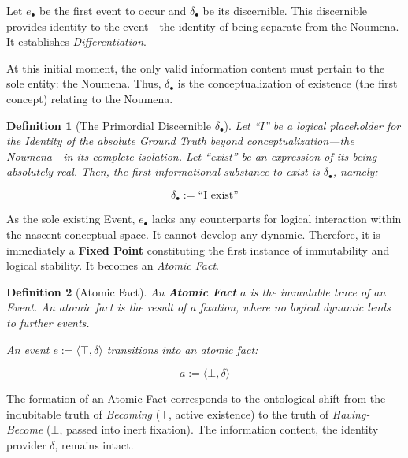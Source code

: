 \documentclass[11pt, a4paper]{article}
\theoremstyle{formalism}
\newtheorem{formalism}{Definition}
\begin{document}
Let $e_\bullet$ be the first event to occur and $\delta_\bullet$ be its
discernible. This discernible provides identity to the event---the identity
of being separate from the Noumena. It establishes \textit{Differentiation}.

At this initial moment, the only valid information content must pertain to the
sole entity: the Noumena. Thus, $\delta_\bullet$ is the conceptualization of
existence (the first concept) relating to the Noumena. 

\begin{formalism}[The Primordial Discernible $\delta_\bullet$]
    Let ``I'' be a logical placeholder for the Identity of the absolute Ground
    Truth beyond conceptualization---the Noumena---in its complete isolation. Let 
    ``exist'' be an expression of its being absolutely real. Then, the first
    informational substance to exist is $\delta_\bullet$, namely:

    \begin{equation}
         \delta_\bullet := \text{``I exist''}
    \end{equation}
\end{formalism}

As the sole existing Event, $e_\bullet$ lacks any counterparts for logical
interaction within the nascent conceptual space. It cannot develop any dynamic.
Therefore, it is immediately a \textbf{Fixed Point} constituting the first
instance of immutability and logical stability. It becomes an \textit{Atomic
Fact}.

\begin{formalism}[Atomic Fact]

    An \textbf{Atomic Fact} $a$ is the immutable trace of an Event. An atomic
    fact is the result of a fixation, where no logical dynamic leads to further
    events.

    An event $e := \langle \top, \delta \rangle$ transitions into an atomic fact:

    \begin{equation}
        a := \langle \bot, \delta \rangle
    \end{equation}
\end{formalism}

The formation of an Atomic Fact corresponds to the ontological shift from
the indubitable truth of \textit{Becoming} ($\top$, active existence) to
the truth of \textit{Having-Become} ($\bot$, passed into inert fixation). The
information content, the identity provider $\delta$, remains intact.
\end{document}
